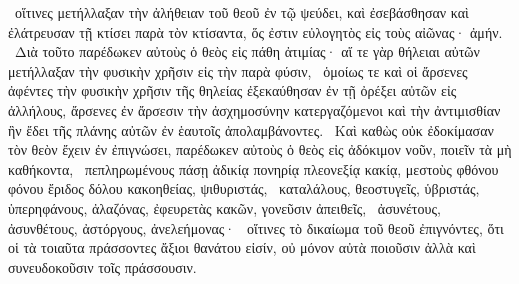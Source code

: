~οἵτινες μετήλλαξαν τὴν ἀλήθειαν τοῦ θεοῦ ἐν τῷ ψεύδει, καὶ ἐσεβάσθησαν καὶ ἐλάτρευσαν τῇ κτίσει παρὰ τὸν κτίσαντα, ὅς ἐστιν εὐλογητὸς εἰς τοὺς αἰῶνας· ἀμήν.
~Διὰ τοῦτο παρέδωκεν αὐτοὺς ὁ θεὸς εἰς πάθη ἀτιμίας· αἵ τε γὰρ θήλειαι αὐτῶν μετήλλαξαν τὴν φυσικὴν χρῆσιν εἰς τὴν παρὰ φύσιν,
~ὁμοίως τε καὶ οἱ ἄρσενες ἀφέντες τὴν φυσικὴν χρῆσιν τῆς θηλείας ἐξεκαύθησαν ἐν τῇ ὀρέξει αὐτῶν εἰς ἀλλήλους, ἄρσενες ἐν ἄρσεσιν τὴν ἀσχημοσύνην κατεργαζόμενοι καὶ τὴν ἀντιμισθίαν ἣν ἔδει τῆς πλάνης αὐτῶν ἐν ἑαυτοῖς ἀπολαμβάνοντες.
~Καὶ καθὼς οὐκ ἐδοκίμασαν τὸν θεὸν ἔχειν ἐν ἐπιγνώσει, παρέδωκεν αὐτοὺς ὁ θεὸς εἰς ἀδόκιμον νοῦν, ποιεῖν τὰ μὴ καθήκοντα,
~πεπληρωμένους πάσῃ ἀδικίᾳ πονηρίᾳ πλεονεξίᾳ κακίᾳ, μεστοὺς φθόνου φόνου ἔριδος δόλου κακοηθείας, ψιθυριστάς,
~καταλάλους, θεοστυγεῖς, ὑβριστάς, ὑπερηφάνους, ἀλαζόνας, ἐφευρετὰς κακῶν, γονεῦσιν ἀπειθεῖς,
~ἀσυνέτους, ἀσυνθέτους, ἀστόργους, ἀνελεήμονας·
~οἵτινες τὸ δικαίωμα τοῦ θεοῦ ἐπιγνόντες, ὅτι οἱ τὰ τοιαῦτα πράσσοντες ἄξιοι θανάτου εἰσίν, οὐ μόνον αὐτὰ ποιοῦσιν ἀλλὰ καὶ συνευδοκοῦσιν τοῖς πράσσουσιν.


